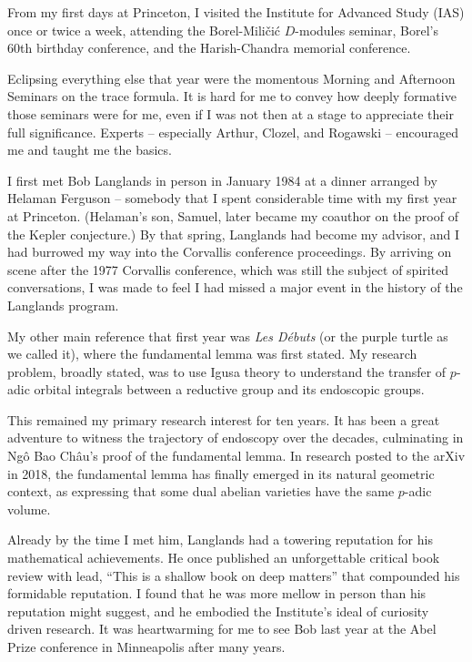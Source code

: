 From my first days at Princeton, I visited the Institute for Advanced
Study (IAS) once or twice a week, attending the Borel-Mili\v ci\'c
$D$-modules seminar, Borel's 60th birthday conference, and the
Harish-Chandra memorial conference.

Eclipsing everything else that year were the momentous Morning and
Afternoon Seminars on the trace formula.  It is hard for me to convey
how deeply formative those seminars were for me, even if I was not
then at a stage to appreciate their full significance.  Experts --
especially Arthur, Clozel, and Rogawski -- encouraged me and taught me
the basics.  

I first met Bob Langlands in person in January 1984 at a dinner
arranged by Helaman Ferguson -- somebody that I spent considerable
time with my first year at Princeton. (Helaman's son, Samuel, later
became my coauthor on the proof of the Kepler conjecture.)  By that
spring, Langlands had become my advisor, and I had burrowed my way
into the Corvallis conference proceedings.  By arriving on scene after
the 1977 Corvallis conference, which was still the subject of spirited
conversations, I was made to feel I had missed a major event in the
history of the Langlands program.

My other main reference that first year was {\it Les D\'ebuts} (or the
purple turtle as we called it), where the fundamental lemma was
first stated.  My research problem, broadly stated, was to use Igusa
theory to understand the transfer of $p$-adic orbital integrals
between a reductive group and its endoscopic groups.

This remained my primary research interest for ten years.  It has been
a great adventure to witness the trajectory of endoscopy over the
decades, culminating in Ng\^o Bao Ch\^au's proof of the fundamental
lemma.  In research posted to the arXiv in 2018, the fundamental
lemma has finally emerged in its natural geometric context, as
expressing that some dual abelian varieties have the same $p$-adic
volume.

\smallskip

Already by the time I met him, Langlands had a towering reputation for
his mathematical achievements.  He once published an unforgettable
critical book review with lead, ``This is a shallow book on deep
matters'' that compounded his formidable reputation.  I found that he
was more mellow in person than his reputation might suggest, and he
embodied the Institute's ideal of curiosity driven research.  It was
heartwarming for me to see Bob last year at the Abel Prize conference
in Minneapolis after many years.

